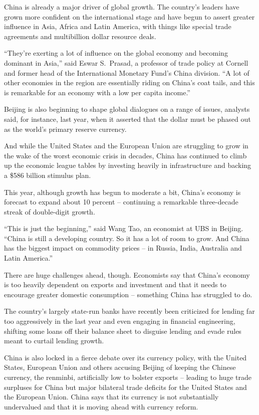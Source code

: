 ﻿\documentclass[12pt]{article}
\begin{document}
China is already a major driver of global growth. The country's leaders have grown more confident on
the international stage and have begun to assert greater influence in Asia, Africa and Latin
America, with things like special trade agreements and multibillion dollar resource deals.

``They're exerting a lot of influence on the global economy and becoming dominant in Asia,'' said
Eswar S.~Prasad, a professor of trade policy at Cornell and former head of the International
Monetary Fund's China division. ``A lot of other economies in the region are essentially riding on
China's coat tails, and this is remarkable for an economy with a low per capita income.''

Beijing is also beginning to shape global dialogues on a range of issues, analysts said, for
instance, last year, when it asserted that the dollar must be phased out as the world's primary
reserve currency.

And while the United States and the European Union are struggling to grow in the wake of the worst
economic crisis in decades, China has continued to climb up the economic league tables by investing
heavily in infrastructure and backing a \$586 billion stimulus plan.

This year, although growth has begun to moderate a bit, China's economy is forecast to expand about
10 percent -- continuing a remarkable three-decade streak of double-digit growth.

``This is just the beginning,'' said Wang Tao, an economist at UBS in Beijing. ``China is still a
developing country. So it has a lot of room to grow. And China has the biggest impact on commodity
prices -- in Russia, India, Australia and Latin America.''

There are huge challenges ahead, though. Economists say that China's economy is too heavily
dependent on exports and investment and that it needs to encourage greater domestic consumption --
something China has struggled to do.

The country's largely state-run banks have recently been criticized for lending far too aggressively
in the last year and even engaging in financial engineering, shifting some loans off their balance
sheet to disguise lending and evade rules meant to curtail lending growth.

China is also locked in a fierce debate over its currency policy, with the United States, European
Union and others accusing Beijing of keeping the Chinese currency, the renminbi, artificially low to
bolster exports -- leading to huge trade surpluses for China but major bilateral trade deficits for
the United States and the European Union. China says that its currency is not substantially
undervalued and that it is moving ahead with currency reform.
\end{document}
